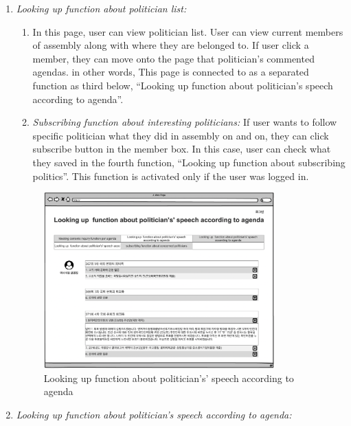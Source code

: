 \documentclass[conference]{IEEEtran}
\begin{document}
\begin{enumerate}
\begin{enumerate}
        \item \textit{Looking up function about politician list: }  \\
                 \begin{enumerate}
 
        \item \textit{} In this page, user can view politician list. User can view current members of assembly along with where they are belonged to. If user click a member, they can move onto the page that politician’s commented agendas. in other words, This page is connected to as a separated function as third below, “Looking up  function about politician’s speech according to agenda”. \\
        \item \textit{Subscribing function about interesting politicians:} If user wants to follow specific politician what they did in assembly  on and on, they can click subscribe button in the member box. In this case, user can check what they saved in the fourth function, “Looking up function about subscribing politics”. This function is activated only if the user was logged in.\\
           \end{enumerate}
           
                                    \begin{figure}[htbp]
    \centerline{\includegraphics[width=89mm,scale=0.5]{fig/7.png}}
    \caption{Looking up  function about politician’s' speech according to agenda}
    \label{fig}
    \end{figure}     
     
        \item \textit{Looking up function about politician’s speech according to agenda:}  \\
                 \begin{enumerate}
 

\end{enumerate}
\end{enumerate}
\end{enumerate}
\end{document}
